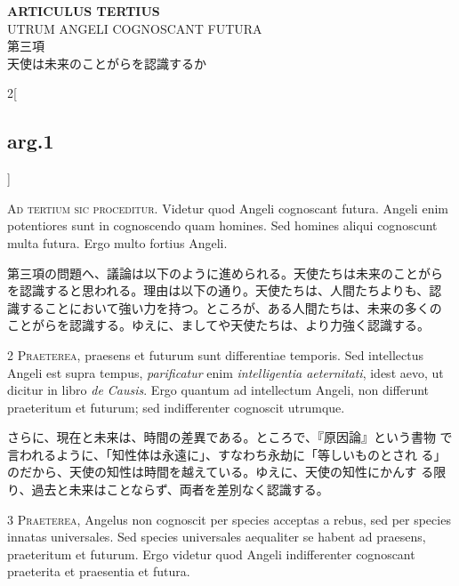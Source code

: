 \documentclass[paper=a4paper,fontsize=10pt,jafontsize=9pt,titlepage]{jlreq}
\begin{document}
\begin{center}
{\Large {\bfseries ARTICULUS TERTIUS}}\\ {\large UTRUM ANGELI COGNOSCANT
FUTURA}\\ {\Large 第三項\\天使は未来のことがらを認識するか}
\end{center}

\begin{paracol}{2}[\subsection{arg.1}]

{\huge A}{\scshape d tertium sic proceditur}. Videtur quod Angeli
cognoscant futura. Angeli enim potentiores sunt in cognoscendo quam
homines. Sed homines aliqui cognoscunt multa futura. Ergo multo
fortius Angeli.

\switchcolumn

第三項の問題へ、議論は以下のように進められる。天使たちは未来のことがら
を認識すると思われる。理由は以下の通り。天使たちは、人間たちよりも、認
識することにおいて強い力を持つ。ところが、ある人間たちは、未来の多くの
ことがらを認識する。ゆえに、ましてや天使たちは、より力強く認識する。


{\scshape 2 Praeterea}, praesens et futurum sunt differentiae
temporis. Sed intellectus Angeli est supra tempus, {\itshape
parificatur} enim {\itshape intelligentia aeternitati}, idest aevo, ut
dicitur in libro {\itshape de Causis}. Ergo quantum ad intellectum
Angeli, non differunt praeteritum et futurum; sed indifferenter
cognoscit utrumque.

\switchcolumn

さらに、現在と未来は、時間の差異である。ところで、『原因論』という書物
で言われるように、「知性体は永遠に」、すなわち永劫に「等しいものとされ
る」のだから、天使の知性は時間を越えている。ゆえに、天使の知性にかんす
る限り、過去と未来はことならず、両者を差別なく認識する。


{\scshape 3 Praeterea}, Angelus non cognoscit per species acceptas a
rebus, sed per species innatas universales. Sed species universales
aequaliter se habent ad praesens, praeteritum et futurum. Ergo videtur
quod Angeli indifferenter cognoscant praeterita et praesentia et
futura.


\end{paracol}
\end{document}
